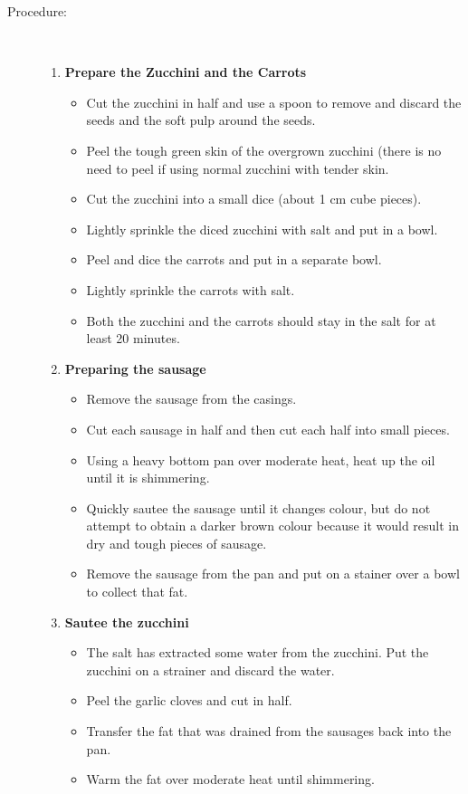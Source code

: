 \documentclass[11pt,letterpaper]{article}
\begin{document}
\begin{description}
\item[Procedure:]\ \\
	\begin{enumerate}
	\item {\bf Prepare the Zucchini and the Carrots}
	\begin{itemize}
	\item Cut the zucchini in half and use a spoon to remove and discard the seeds and the soft pulp around the seeds.
	\item Peel the tough green skin of the overgrown zucchini (there is no need to peel if using normal zucchini with tender skin.
	\item Cut the zucchini into a small dice (about 1 cm cube pieces).
	\item Lightly sprinkle the diced zucchini with salt and put in a bowl.
	\item Peel and dice the carrots and put in a separate bowl.
	\item Lightly sprinkle the carrots with salt.
	\item Both the zucchini and the carrots should stay in the salt for at least 20 minutes.
	\end{itemize}
	\item {\bf Preparing the sausage}
	\begin{itemize}
	\item Remove the sausage from the casings.
	\item Cut each sausage in half and then cut each half into small pieces.
	\item Using a heavy bottom pan over moderate heat, heat up the oil until it is shimmering. 
	\item Quickly sautee the sausage until it changes colour, but do not attempt to obtain a darker brown colour because it would result in dry and tough pieces of sausage.
	\item Remove the sausage from the pan and put on a stainer over a bowl to collect that fat.
	\end{itemize}
	\item{\bf Sautee the zucchini}
	\begin{itemize}
	\item The salt has extracted some water from the zucchini. Put the zucchini on a strainer and discard the water.
	\item Peel the garlic cloves and cut in half.
	\item Transfer the fat that was drained from the sausages back into the pan. 
	\item Warm the fat over moderate heat until shimmering.

\end{itemize}
\end{enumerate}
\end{description}
\end{document}
